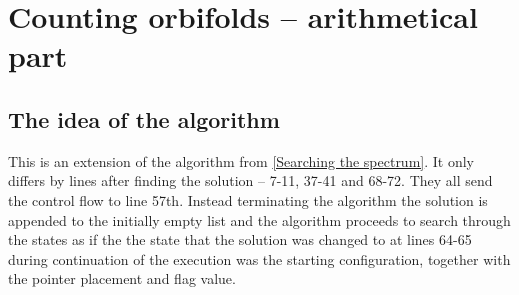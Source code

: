 \chapter{Counting orbifolds -- arithmetical part}\label{Counting orbifolds -- arithmetical part}





\section{The idea of the algorithm}
This is an extension of the algorithm from \ref{Searching the spectrum}. It only differs by 
lines after finding the solution -- 7-11, 37-41 and 68-72. They all send the control flow 
to line 57th.
Instead terminating the algorithm the solution is appended to the 
initially empty list and the algorithm proceeds to search through the states as if the 
the state that the solution was changed to 
at lines 64-65 during continuation of the execution was  
the starting configuration, together with the pointer placement and flag value. 

